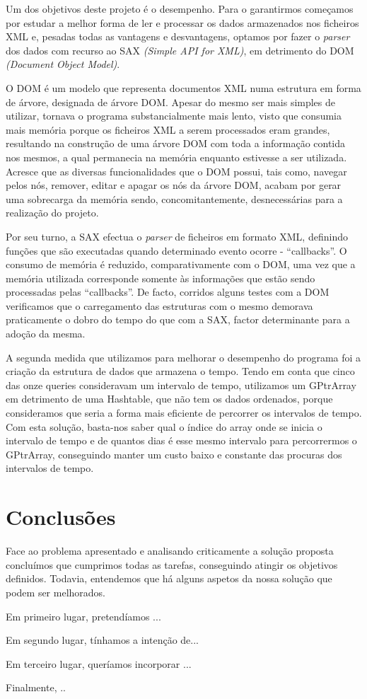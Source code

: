 \documentclass[a4paper]{article}
\begin{document}
Um dos objetivos deste projeto é o desempenho. Para o garantirmos começamos por
estudar a melhor forma de ler e processar os dados armazenados
nos ficheiros XML e, pesadas todas as vantagens e desvantagens, optamos por fazer o
\textit{parser} dos dados com recurso ao SAX \textit{(Simple API for XML)},
em detrimento do DOM \textit{(Document Object Model)}. \par
O DOM é um modelo que representa documentos XML numa estrutura
em forma de árvore, designada de árvore DOM. Apesar do mesmo ser mais simples de utilizar,
tornava o programa substancialmente mais lento, visto que consumia mais memória porque os ficheiros
XML a serem processados eram grandes, resultando na construção de uma árvore DOM com toda a informação
contida nos mesmos, a qual permanecia na memória enquanto estivesse a ser utilizada. Acresce que
as diversas funcionalidades que o DOM possui, tais como, navegar pelos nós, remover, editar e apagar
os nós da árvore DOM, acabam por gerar uma sobrecarga da memória sendo, concomitantemente,
desnecessárias para a realização do projeto. \par
Por seu turno, a SAX efectua o \textit{parser} de ficheiros em formato XML, definindo
funções que são executadas quando determinado evento ocorre - ``callbacks''. O consumo de memória
é reduzido, comparativamente com o DOM, uma vez que a memória utilizada corresponde somente às
informações que estão sendo processadas pelas ``callbacks''. De facto, corridos alguns testes com
a DOM verificamos que o carregamento das estruturas com o mesmo demorava praticamente o dobro do
tempo do que com a SAX, factor determinante para a adoção da mesma. \par

A segunda medida que utilizamos para melhorar o desempenho do programa foi a criação
da estrutura de dados que armazena o tempo. Tendo em conta que cinco das onze queries
consideravam um intervalo de tempo, utilizamos um GPtrArray em detrimento de uma
Hashtable, que não tem os dados ordenados, porque consideramos que seria a forma mais
eficiente de percorrer os intervalos de tempo. Com esta solução, basta-nos saber qual
o índice do array onde se inicia o intervalo de tempo e de quantos dias é esse mesmo
intervalo para percorrermos o GPtrArray, conseguindo manter um custo baixo e constante
das procuras dos intervalos de tempo. \par


\section{Conclusões}
\label{sec:conclusao}

Face ao problema apresentado e analisando criticamente a solução proposta concluímos
que cumprimos todas as tarefas, conseguindo atingir os objetivos definidos. Todavia,
entendemos que há alguns aspetos da nossa solução que podem ser melhorados.

Em primeiro lugar, pretendíamos ...

Em segundo lugar, tínhamos a intenção de...

Em terceiro lugar, queríamos incorporar ...

Finalmente, ..
\end{document}
